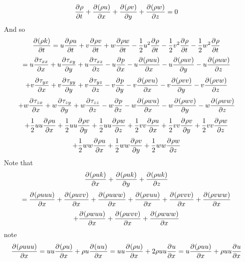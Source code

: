 \documentclass[12pt]{article}
\numberwithin{equation}{section}
\numberwithin{figure}{section}
\begin{document}
\begin{equation}
\pdv{\rho}{t} + \pdv{(\rho u)}{x} + \pdv{(\rho v)}{y} + \pdv{(\rho w)}{z} = 0
\end{equation}
And so
\begin{equation}
\pdv{(\rho k)}{t} = u\pdv{\rho u}{t} + v\pdv{\rho v}{t} + w\pdv{\rho w}{t} - \frac{1}{2}u^2 \pdv{\rho}{t} - \frac{1}{2}v^2 \pdv{\rho}{t} - \frac{1}{2}w^2 \pdv{\rho}{t}
\end{equation}
\begin{equation}
= u\pdv{\tau_{xx}}{x} + u\pdv{\tau_{xy}}{y} + u\pdv{\tau_{xz}}{z} - u\pdv{p}{x} - u\pdv{(\rho u u)}{x} - u \pdv{(\rho u v)}{y} - u \pdv{(\rho u w)}{z}
\end{equation}
\begin{equation}
+ v\pdv{\tau_{yx}}{x} + v\pdv{\tau_{yy}}{y} + v\pdv{\tau_{yz}}{z} - v\pdv{p}{y} - v\pdv{(\rho v u)}{x} - v \pdv{(\rho v v)}{y} - v \pdv{(\rho v w)}{z}
\end{equation}
\begin{equation}
+ w\pdv{\tau_{zx}}{x} + w\pdv{\tau_{zy}}{y} + w\pdv{\tau_{zz}}{z} - w\pdv{p}{z} - w\pdv{(\rho w u)}{x} - w \pdv{(\rho w v)}{y} - w \pdv{(\rho w w)}{z}
\end{equation}
\begin{equation}
+ \frac{1}{2}uu \pdv{\rho u}{x} + \frac{1}{2}uu \pdv{\rho v}{y} + \frac{1}{2}uu \pdv{\rho w}{z} + \frac{1}{2}vv \pdv{\rho u}{x} + \frac{1}{2}vv \pdv{\rho v}{y} + \frac{1}{2}vv \pdv{\rho w}{z}
\end{equation}
\begin{equation}
+ \frac{1}{2}ww \pdv{\rho u}{x} + \frac{1}{2}ww \pdv{\rho v}{y} + \frac{1}{2}ww \pdv{\rho w}{z}
\end{equation}
Note that
\begin{equation}
\pdv{(\rho u k)}{x} + \pdv{(\rho u k)}{y} + \pdv{(\rho u k)}{z}
\end{equation}
\begin{equation}
= \pdv{(\rho u u u)}{x} + \pdv{(\rho u v v)}{x} + \pdv{(\rho u w w)}{x}
+ \pdv{(\rho v u u)}{x} + \pdv{(\rho v v v)}{x} + \pdv{(\rho v w w)}{x}
\end{equation}
\begin{equation}
+ \pdv{(\rho w u u)}{x} + \pdv{(\rho w v v)}{x} + \pdv{(\rho w w w)}{x}
\end{equation}
note
\begin{equation}
\pdv{(\rho u u u)}{x} = u u \pdv{(\rho u)}{x} + \rho u \pdv{(u u)}{x} = u u \pdv{(\rho u)}{x} + 2\rho u u\pdv{u}{x} = u \pdv{(\rho u u)}{x} + \rho u u \pdv{u}{x}
\end{equation}
\end{document}
